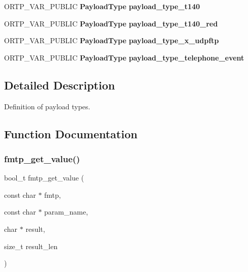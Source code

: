 \begin{DoxyCompactItemize}
O\+R\+T\+P\+\_\+\+V\+A\+R\+\_\+\+P\+U\+B\+L\+IC \textbf{ Payload\+Type} {\bfseries payload\+\_\+type\+\_\+t140}
\item 
\mbox{\label{payloadtype_8h_aded18ebcd610fb672b75bb6f824a5101}} 
O\+R\+T\+P\+\_\+\+V\+A\+R\+\_\+\+P\+U\+B\+L\+IC \textbf{ Payload\+Type} {\bfseries payload\+\_\+type\+\_\+t140\+\_\+red}
\item 
\mbox{\label{payloadtype_8h_a84b81b1cd4183aca065e07954dba7e62}} 
O\+R\+T\+P\+\_\+\+V\+A\+R\+\_\+\+P\+U\+B\+L\+IC \textbf{ Payload\+Type} {\bfseries payload\+\_\+type\+\_\+x\+\_\+udpftp}
\item 
\mbox{\label{payloadtype_8h_a0ff3f0b43f08ab0eef7725cec24be02f}} 
O\+R\+T\+P\+\_\+\+V\+A\+R\+\_\+\+P\+U\+B\+L\+IC \textbf{ Payload\+Type} {\bfseries payload\+\_\+type\+\_\+telephone\+\_\+event}
\end{DoxyCompactItemize}


\subsection{Detailed Description}
Definition of payload types. 



\subsection{Function Documentation}
\mbox{\label{payloadtype_8h_a26c31ad82ef6de2791b3ec535c1d70ef}} 
\subsubsection{fmtp\+\_\+get\+\_\+value()}
{\footnotesize\ttfamily bool\+\_\+t fmtp\+\_\+get\+\_\+value (\begin{DoxyParamCaption}\item[{const char $\ast$}]{fmtp,  }\item[{const char $\ast$}]{param\+\_\+name,  }\item[{char $\ast$}]{result,  }\item[{size\+\_\+t}]{result\+\_\+len }\end{DoxyParamCaption})}

